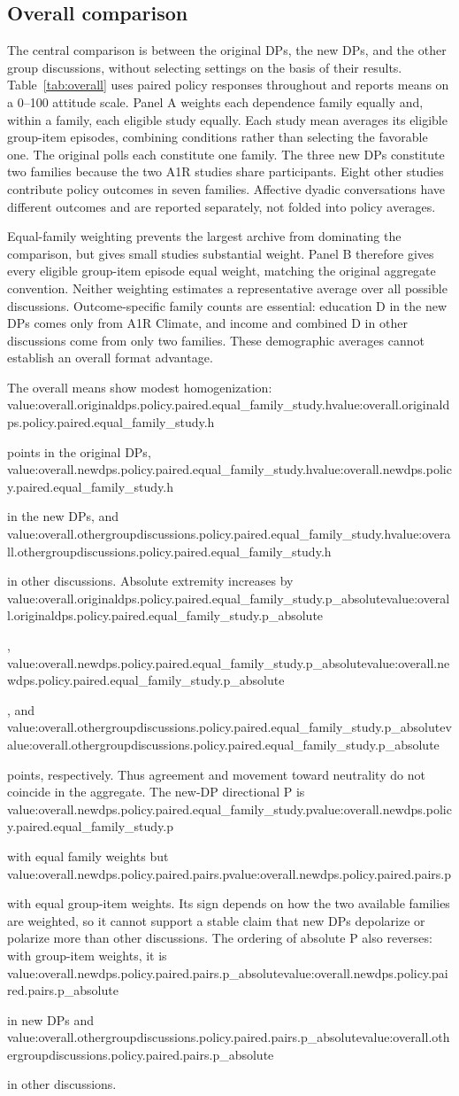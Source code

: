 \documentclass[11pt]{article}
\newcommand{\valueof}[1]{\ifcsname value:#1\endcsname\csname value:#1\endcsname\else\PackageError{oos}{Missing generated value #1}{Run make oos-paper}\fi}
\newcommand{\overall}[3]{\valueof{overall.#1.policy.paired.#2.#3}}
\begin{document}
\subsection{Overall comparison}
The central comparison is between the original DPs, the new DPs, and the other
group discussions, without selecting settings on the basis of their results.
Table~\ref{tab:overall} uses paired policy responses throughout and reports means
on a 0--100 attitude scale. Panel A weights each dependence family equally and,
within a family, each eligible study equally. Each study mean averages its eligible
group-item episodes, combining conditions rather than selecting the favorable one.
The original polls each constitute one family. The three new DPs constitute two
families because the two A1R studies share participants. Eight other studies
contribute policy outcomes in seven families. Affective dyadic conversations have
different outcomes and are reported separately, not folded into policy averages.

Equal-family weighting prevents the largest archive from dominating the comparison,
but gives small studies substantial weight. Panel B therefore gives every eligible
group-item episode equal weight, matching the original aggregate convention.
Neither weighting estimates a representative average over all possible discussions.
Outcome-specific family counts are essential: education D in the new DPs comes
only from A1R Climate, and income and combined D in other discussions come from
only two families. These demographic averages cannot establish an overall format
advantage.

The overall means show modest homogenization:
\overall{originaldps}{equal_family_study}{h} points in the original DPs,
\overall{newdps}{equal_family_study}{h} in the new DPs, and
\overall{othergroupdiscussions}{equal_family_study}{h} in other discussions.
Absolute extremity increases by
\overall{originaldps}{equal_family_study}{p_absolute},
\overall{newdps}{equal_family_study}{p_absolute}, and
\overall{othergroupdiscussions}{equal_family_study}{p_absolute} points,
respectively. Thus agreement and movement toward neutrality do not coincide in
the aggregate. The new-DP directional P is
\overall{newdps}{equal_family_study}{p} with equal family weights but
\overall{newdps}{pairs}{p} with equal group-item weights. Its sign depends on how
the two available families are weighted, so it cannot support a stable claim
that new DPs depolarize or polarize more than other discussions.
The ordering of absolute P also reverses: with group-item weights, it is
\overall{newdps}{pairs}{p_absolute} in new DPs and
\overall{othergroupdiscussions}{pairs}{p_absolute} in other discussions.
\end{document}
